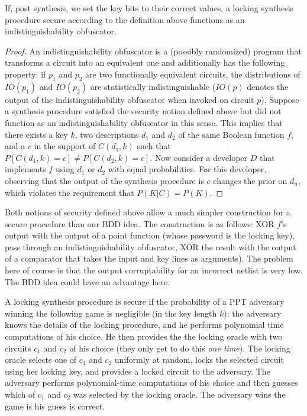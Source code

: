 
\begin{proposition}
If, post synthesis, we set the key bits to their correct values, a locking synthesis procedure secure according to the definition above functions as an indistinguishability obfuscator.
\end{proposition}

\begin{proof}
An indistinguishability obfuscator is a (possibly randomized) program that transforms a circuit into an equivalent one and additionally has the following property: if $p_1$ and $p_2$ are two functionally equivalent circuits, the distributions of $IO(p_1)$ and $IO(p_2)$ are statistically indistinguishable ($IO(p)$ denotes the output of the indistinguishability obfuscator when invoked on circuit $p$). Suppose a synthesis procedure satisfied the security notion defined above but did not function as an indistinguishability obfuscator in this sense. This implies that there exists a key $k$, two descriptions $d_1$ and $d_2$ of the same Boolean function $f$, and a $c$ in the support of $C(d_1,k)$ such that $P[C(d_1,k)=c]\neq P[C(d_2,k)=c]$. Now consider a developer $D$ that implements $f$ using $d_1$ or $d_2$ with equal probabilities. For this developer, observing that the output of the synthesis procedure is $c$ changes the prior on $d_n$, which violates the requirement that $P(K|C)=P(K)$.
\end{proof}

Both notions of security defined above allow a much simpler construction for a secure procedure than our BDD idea. The construction is as follows: XOR $f$'s output with the output of a point function (whose password is the locking key), pass through an indistinguishability obfuscator, XOR the result with the output of a comparator that takes the input and key lines as arguments). The problem here of course is that the output corruptability for an incorrect netlist is very low. The BDD idea could have an advantage here.

\begin{definition}
A locking synthesis procedure is secure if the probability of a PPT adversary winning the following game is negligible (in the key length $k$): the adversary knows the details of the locking procedure, and he performs polynomial time computations of his choice. He then provides the the locking oracle with two circuits $c_1$ and $c_2$ of his choice (they only get to do this \emph{one time}). The locking oracle selects one of $c_1$ and $c_2$ uniformly at random, locks the selected circuit using her locking key, and provides a locked circuit to the adversary. The adversary performs polynomial-time computations of his choice and then guesses which of $c_1$ and $c_2$ was selected by the locking oracle. The adversary wins the game is his guess is correct.
\end{definition}

